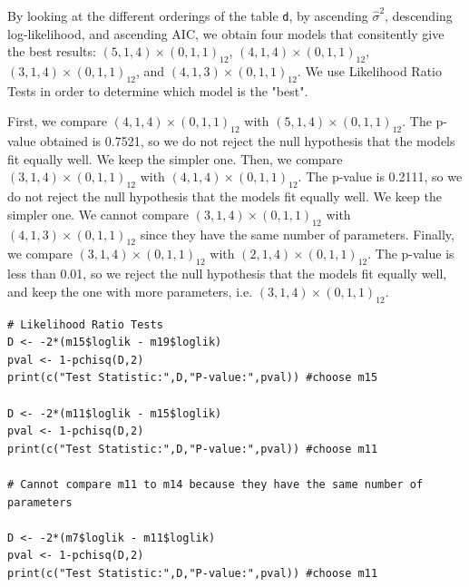 \documentclass[]{article}
\begin{document}
By looking at the different orderings of the table \texttt{d}, by ascending $\hat{\sigma}^2$, descending log-likelihood, and ascending AIC, we obtain four models that consitently give the best results: $(5,1,4)\times(0,1,1)_{12}$, $(4,1,4)\times(0,1,1)_{12}$, $(3,1,4)\times(0,1,1)_{12}$, and $(4,1,3)\times(0,1,1)_{12}$. We use Likelihood Ratio Tests in order to determine which model is the "best".

First, we compare $(4,1,4)\times(0,1,1)_{12}$ with $(5,1,4)\times(0,1,1)_{12}$. The p-value obtained is 0.7521, so we do not reject the null hypothesis that the models fit equally well. We keep the simpler one. Then, we compare $(3,1,4)\times(0,1,1)_{12}$ with $(4,1,4)\times(0,1,1)_{12}$. The p-value is 0.2111, so we do not reject the null hypothesis that the models fit equally well. We keep the simpler one. We cannot compare $(3,1,4)\times(0,1,1)_{12}$ with $(4,1,3)\times(0,1,1)_{12}$ since they have the same number of parameters. Finally, we compare $(3,1,4)\times(0,1,1)_{12}$ with $(2,1,4)\times(0,1,1)_{12}$. The p-value is less than 0.01, so we reject the null hypothesis that the models fit equally well, and keep the one with more parameters, i.e. $(3,1,4)\times(0,1,1)_{12}$.

\begin{Verbatim}[frame=single]
# Likelihood Ratio Tests
D <- -2*(m15$loglik - m19$loglik)
pval <- 1-pchisq(D,2)
print(c("Test Statistic:",D,"P-value:",pval)) #choose m15

D <- -2*(m11$loglik - m15$loglik)
pval <- 1-pchisq(D,2)
print(c("Test Statistic:",D,"P-value:",pval)) #choose m11

# Cannot compare m11 to m14 because they have the same number of parameters

D <- -2*(m7$loglik - m11$loglik)
pval <- 1-pchisq(D,2)
print(c("Test Statistic:",D,"P-value:",pval)) #choose m11
\end{Verbatim}


\color{black}
\end{document}
